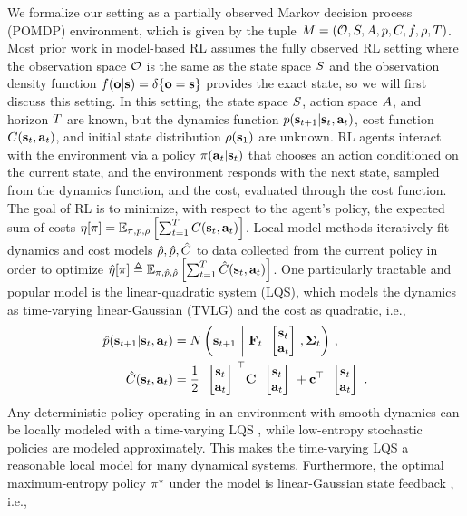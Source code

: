 We formalize our setting as a partially observed Markov decision process (POMDP) environment, which is given by the tuple $M=(\mathcal{O},S,A,p,C,f,\rho,T)$. Most prior work in model-based RL assumes the fully observed RL setting where the observation space $\mathcal{O}$ is the same as the state space $S$ and the observation density function $f(\mathbf{o}|\mathbf{s})=\delta\{\mathbf{o}=\mathbf{s}\}$ provides the exact state, so we will first discuss this setting. In this setting, the state space $S$, action space $A$, and horizon $T$ are known, but the dynamics function $p(\mathbf{s}_{t+1}|\mathbf{s}_t,\mathbf{a}_t)$, cost function $C(\mathbf{s}_t,\mathbf{a}_t)$, and initial state distribution $\rho(\mathbf{s}_1)$ are unknown. RL agents interact with the environment via a policy $\pi(\mathbf{a}_t|\mathbf{s}_t)$ that chooses an action conditioned on the current state, and the environment responds with the next state, sampled from the dynamics function, and the cost, evaluated through the cost function. The goal of RL is to minimize, with respect to the agent's policy, the expected sum of costs $\eta[\pi]=\mathbb{E}_{\pi,p,\rho}\left[\sum_{t=1}^TC(\mathbf{s}_t,\mathbf{a}_t)\right]$. Local model methods iteratively fit dynamics and cost models $\hat{\rho},\hat{p},\hat{C}$ to data collected from the current policy in order to optimize $\hat{\eta}[\pi]\triangleq\mathbb{E}_{\pi,\hat{p},\hat{\rho}}\left[\sum_{t=1}^T\hat{C}(\mathbf{s}_t,\mathbf{a}_t)\right]$. One particularly tractable and popular model is the linear-quadratic system (LQS), which models the dynamics as time-varying linear-Gaussian (TVLG) and the cost as quadratic, i.e.,
\begin{align*}
    \dynmodel(\state_{t+1}|\state_t,\action_t)&=\N\left(\state_{t+1}~\bigg|~\dynmat_t\colvec{\state_t\\\action_t},\dyncovar_t\right)\,,\\
    \costmodel(\state_t,\action_t)&=\frac{1}{2}\colvec{\state_t\\\action_t}^\top\costmat\colvec{\state_t\\\action_t}+\costvec^\top\colvec{\state_t\\\action_t}\,.
\end{align*}
Any deterministic policy operating in an environment with smooth dynamics can be locally modeled with a time-varying LQS \citep{convex}, while low-entropy stochastic policies are modeled approximately. This makes the time-varying LQS a reasonable local model for many dynamical systems. Furthermore, the optimal maximum-entropy policy $\pi^\star$ under the model is linear-Gaussian state feedback \citep{ddp}, i.e.,

